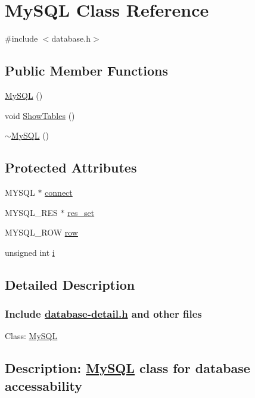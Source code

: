 \hypertarget{classMySQL}{\section{My\-S\-Q\-L Class Reference}
\label{classMySQL}
}


{\ttfamily \#include $<$database.\-h$>$}

\subsection*{Public Member Functions}
\begin{DoxyCompactItemize}
\item 
\hyperlink{classMySQL_abc2ca1b4be66f7e588e00dab96d91d43}{My\-S\-Q\-L} ()
\item 
void \hyperlink{classMySQL_a42c6e9cd84c97a0fb154ad682a4b4a4e}{Show\-Tables} ()
\item 
\hyperlink{classMySQL_ab27885d0695900ade2b7a0d57375a9bf}{$\sim$\-My\-S\-Q\-L} ()
\end{DoxyCompactItemize}
\subsection*{Protected Attributes}
\begin{DoxyCompactItemize}
\item 
M\-Y\-S\-Q\-L $\ast$ \hyperlink{classMySQL_a56a2a9159f6d46d8b3bd648e1f08e2b1}{connect}
\item 
M\-Y\-S\-Q\-L\-\_\-\-R\-E\-S $\ast$ \hyperlink{classMySQL_abfe0a8f3fe7af0a582be5882f0afe69d}{res\-\_\-set}
\item 
M\-Y\-S\-Q\-L\-\_\-\-R\-O\-W \hyperlink{classMySQL_a56c73e3942ca040f13164e957a41a340}{row}
\item 
unsigned int \hyperlink{classMySQL_ad7a1cc7a8e202d4d19468731ed22d74a}{i}
\end{DoxyCompactItemize}


\subsection{Detailed Description}


 \subsubsection*{Include \hyperlink{database-detail_8h}{database-\/detail.\-h} and other files}



 Class\-: \hyperlink{classMySQL}{My\-S\-Q\-L} \subsection*{Description\-: \hyperlink{classMySQL}{My\-S\-Q\-L} class for database accessability}

